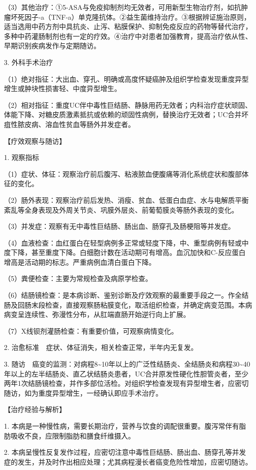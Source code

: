 （3）其他治疗：①5-ASA与免疫抑制剂均无效者，可用新型生物治疗剂，如抗肿瘤坏死因子-a（TNF-a）单克隆抗体。②益生菌维持治疗。③根据辨证施治原则，适当选用中药方剂中具抗炎、止泻、粘膜保护、抑制免疫反应的药物等替代治疗，多种中药灌肠制剂也有一定的疗效。④治疗中对患者加强教育，提高治疗依从性、早期识别疾病发作与定期随访。

3. 外科手术治疗

（1）绝对指征：大出血、穿孔、明确或高度怀疑癌肿及组织学检查发现重度异型增生或肿块性损害轻、中度异型增生。

（2）相对指征：重度UC伴中毒性巨结肠、静脉用药无效者；内科治疗症状顽固、体能下降、对糖皮质激素抵抗或依赖的顽固性病例，替换治疗无效者；UC合并坏疽性脓皮病、溶血性贫血等肠外并发症者。

【疗效观察与随访】

1. 观察指标

（1）症状、体征：观察治疗前后腹泻、粘液脓血便腹痛等消化系统症状和腹部体征的变化。

（2）肠外表现：观察治疗前后发热、消瘦、贫血、低蛋白血症、水与电解质平衡紊乱等全身表现及外周关节炎、巩膜外层炎、前葡萄膜炎等肠外表现的变化。

（3）并发症：观察有无中毒性巨结肠、肠出血、肠穿孔及肠梗阻等并发症。

（4）血液检查：血红蛋白在轻型病例多正常或轻度下降，中、重型病例有轻或中度下降，甚至重度下降。白细胞计数在活动期可有增高。血沉加快和C-反应蛋白增高是活动期的标志。严重病例血清白蛋白下降。

（5）粪便检查：主要为常规检查及病原学检查。

（6）结肠镜检查：是本病诊断、鉴别诊断及疗效观察的最重要手段之一。作全结肠及回肠末段检查，直接观察肠粘膜变化，取活组织检查，并确定病变范围。本病病变呈连续性、弥漫性分布，从肛端直肠开始逆行向上扩展。

（7）X线钡剂灌肠检查：有重要价值，可观察病情变化。

2. 治愈标准　症状、体征消失，相关检查正常，半年内无复发。

3.
随访　癌变的监测：对病程8\textasciitilde{}10年以上的广泛性结肠炎、全结肠炎和病程30\textasciitilde{}40年以上的左半结肠炎、直乙状结肠炎患者，UC合并原发性硬化性胆管炎者，至少两年1次结肠镜检查，并作多部位活检。对组织学检查发现有异型增生者，应密切随访，如为重度异型增生，一经确认即应手术治疗。

【治疗经验与解析】

1.
本病是一种慢性病，需要长期治疗，营养与饮食的调配很重要。腹泻常伴有脂肪吸收不良，应限制脂肪和膳食纤维摄入。

2.
本病呈慢性反复发作过程，应密切注意中毒性巨结肠、肠出血、肠穿孔等并发症的发生，并及时作出相应处理；尤其病程漫长者癌变危险性增加，应密切随访。

